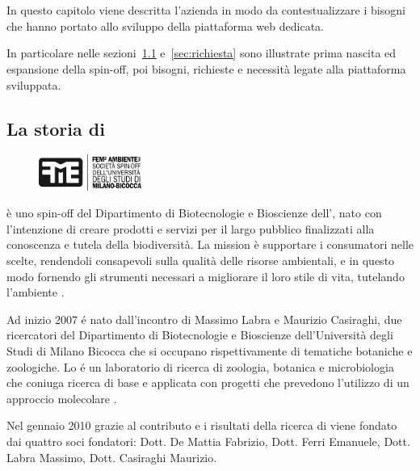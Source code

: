 \chapter{\fem}
\label{chp:fem}

In questo capitolo viene descritta l'azienda \textbf{\femsrl} in modo da contestualizzare i bisogni che hanno portato allo sviluppo della piattaforma web dedicata.

In particolare nelle sezioni~\ref{sec:storia-fem} e~\ref{sec:richiesta} sono illustrate prima nascita ed espansione della spin-off, poi bisogni, richieste e necessità legate alla piattaforma sviluppata.

\section{La storia di \fem}
\label{sec:storia-fem}

\begin{figure}
  \begin{center}
    \includegraphics[width=0.3\textwidth]{images/logo-fem}
  \end{center}
\end{figure}

\textbf{\femsrl} è uno spin-off del Dipartimento di Biotecnologie e Bioscienze dell'{\unimib}, nato con l'intenzione di creare prodotti e servizi per il largo pubblico finalizzati alla conoscenza e tutela della biodiversità. La mission è supportare i consumatori nelle scelte, rendendoli consapevoli sulla qualità delle risorse ambientali, e in questo modo fornendo gli strumenti necessari a migliorare il loro stile di vita, tutelando l'ambiente \cite{fem2ambiente}.

Ad inizio 2007 é nato \textbf{\zpl} dall'incontro di Massimo Labra e Maurizio Casiraghi, due ricercatori del Dipartimento di Biotecnologie e Bioscienze dell'Università degli Studi di Milano Bicocca che si occupano rispettivamente di tematiche botaniche e zoologiche. Lo {\zpl} é un laboratorio di ricerca di zoologia, botanica e microbiologia che coniuga ricerca di base e applicata con progetti che prevedono l'utilizzo di un approccio molecolare \cite{zooplantlab}.

Nel gennaio 2010 grazie al contributo e i risultati della ricerca di {\zpl} viene fondato {\femsrl} dai quattro soci fondatori: Dott. De Mattia Fabrizio, Dott. Ferri Emanuele, Dott. Labra Massimo, Dott. Casiraghi Maurizio.


